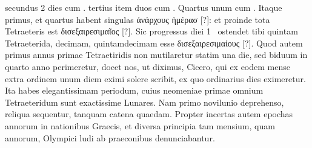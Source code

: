  secundus 2 dies cum . tertius item
duos cum .
Quartus unum cum .
Itaque primus, et quartus
habent singulas \textgreek{ἀνάρχους ἡμέρασ [?]}:
 et proinde tota Tetraeteris est \textgreek{δισεξαιρεσιμαῖος [?]}.
Sic progressus diei 1~
 ostendet tibi quintam Tetraeterida,
decimam, quintamdecimam esse \textgreek{δισεξαιρεσιμαίους [?]}.
Quod autem
primus annus primae Tetraetiridis non mutilaretur statim una die, sed
biduum in quarto anno perimeretur, docet nos, ut diximus, Cicero,
qui ex eodem mense extra ordinem unum diem eximi solere scribit, ex
quo ordinarius dies eximeretur.
Ita habes elegantissimam periodum,
cuius neomeniae primae omnium Tetraeteridum sunt exactissime Lunares.
Nam primo novilunio deprehenso, reliqua sequentur, tanquam
catena quaedam.
Propter incertas autem epochas annorum in nationibus
Graecis, et diversa principia tam mensium, quam annorum, Olympici
ludi ab praeconibus denunciabantur.

